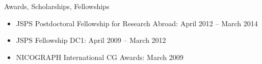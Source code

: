{\Large\sc Awards, Scholarships, Fellowships}
\vspace{-3mm}
\begin{itemize}
\item JSPS Postdoctoral Fellowship for Research Abroad: April 2012 -- March 2014
\item JSPS Fellowship DC1: April 2009 -- March 2012
\item NICOGRAPH International CG Awards: March 2009
\end{itemize}
